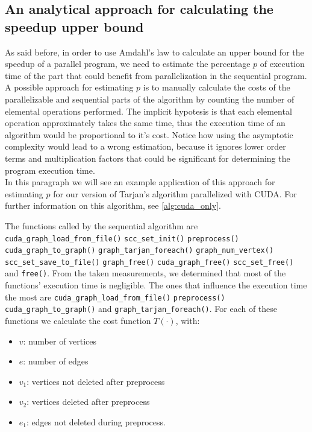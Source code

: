 \subsection{An analytical approach for calculating the speedup upper bound}
As said before, in order to use Amdahl's law to calculate an upper bound for the speedup of a parallel program, we need to estimate the percentage $p$ of execution time of the part that could benefit from parallelization in the sequential program.
\\A possible approach for estimating $p$ is to manually calculate the costs of the parallelizable and sequential parts of the algorithm by counting the number of elemental operations performed. The implicit hypotesis is that each elemental operation approximately takes the same time, thus the execution time of an algorithm would be proportional to it's cost. Notice how using the asymptotic complexity would lead to a wrong estimation, because it ignores lower order terms and multiplication factors that could be significant for determining the program execution time.
\\In this paragraph we will see an example application of this approach for estimating $p$ for our version of Tarjan's algorithm parallelized with CUDA. For further information on this algorithm, see \ref{alg:cuda_only}.

\noindent The functions called by the sequential algorithm are \verb|cuda_graph_load_from_file()| \verb|scc_set_init()| \verb|preprocess()| \verb|cuda_graph_to_graph()| \verb|graph_tarjan_foreach()| \verb|graph_num_vertex()| \verb|scc_set_save_to_file()| \verb|graph_free()| \verb|cuda_graph_free()| \verb|scc_set_free()| and \verb|free()|. From the taken measurements, we determined that most of the functions' execution time is negligible. The ones that influence the execution time the most are \verb|cuda_graph_load_from_file()| \verb|preprocess()| \verb|cuda_graph_to_graph()| and \verb|graph_tarjan_foreach()|. For each of these functions we calculate the cost function $T(\cdot)$, with:
\begin{itemize}
  \item $v$: number of vertices
  \item $e$: number of edges
  \item $v_1$: vertices not deleted after preprocess
  \item $v_2$: vertices deleted after preprocess
  \item $e_1$: edges not deleted during preprocess.
\end{itemize}


